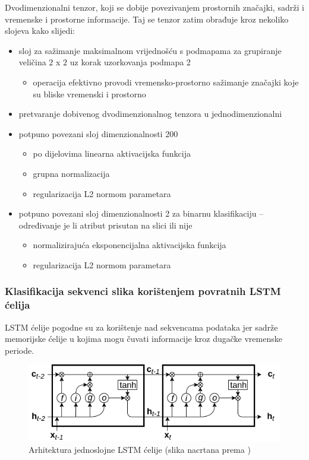 \documentclass[times, utf8, diplomski, numeric]{fer}
\begin{document}
Dvodimenzionalni tenzor, koji se dobije povezivanjem prostornih značajki, sadrži i vremenske i prostorne informacije. 
Taj se tenzor zatim obrađuje kroz nekoliko slojeva kako slijedi:
\begin{itemize}
 \item sloj za sažimanje maksimalnom vrijednošću s podmapama za grupiranje veličina $2$ x $2$ uz korak uzorkovanja podmapa 2
 \begin{itemize}
  \item operacija efektivno provodi vremensko-prostorno sažimanje značajki koje su bliske vremenski i prostorno
 \end{itemize}
 \item pretvaranje dobivenog dvodimenzionalnog tenzora u jednodimenzionalni
 \item potpuno povezani sloj dimenzionalnosti 200
 \begin{itemize}
  \item po dijelovima linearna  aktivacijska funkcija
  \item grupna normalizacija 
  \item regularizacija L2 normom parametara
 \end{itemize}
 \item potpuno povezani sloj dimenzionalnosti 2 za binarnu klasifikaciju -- određivanje je li atribut prisutan na slici ili nije
 \begin{itemize}
  \item normalizirajuća eksponencijalna  aktivacijska funkcija
  \item regularizacija L2 normom parametara
 \end{itemize}
\end{itemize}

\subsubsection{Klasifikacija sekvenci slika korištenjem povratnih LSTM ćelija }
LSTM ćelije pogodne su za korištenje nad sekvencama podataka jer sadrže memorijske ćelije u kojima mogu čuvati informacije kroz dugačke vremenske periode.

\begin{figure}[H]
\centering
\includegraphics[scale=0.7]{images/lstm_input.png}
\caption{Arhitektura jednoslojne LSTM ćelije (slika nacrtana prema \citep{article:lstm})}
\label{img:lstm_input}
\end{figure}
\end{document}
